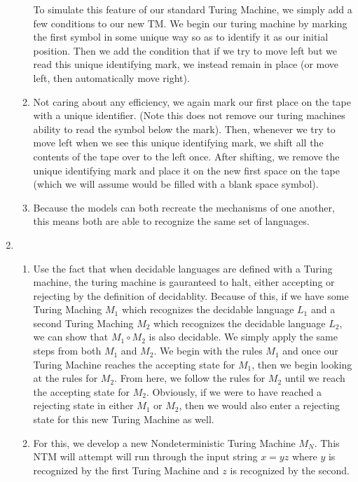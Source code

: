 \documentclass{article}
\begin{document}
\begin{enumerate}
\begin{enumerate}
                To simulate this feature of our standard Turing Machine, we simply add a few conditions to our new TM.
                We begin our turing machine by marking the first symbol in some unique way so as to identify it as our initial position.
                Then we add the condition that if we try to move left but we read this unique identifying mark, we instead remain in place (or move left, then automatically move right).
            \item
                Not caring about any efficiency, we again mark our first place on the tape with a unique identifier. (Note this does not remove our turing machines ability to read the symbol below the mark).
                Then, whenever we try to move left when we see this unique identifying mark, we shift all the contents of the tape over to the left once.
                After shifting, we remove the unique identifying mark and place it on the new first space on the tape (which we will assume would be filled with a blank space symbol).
            \item
                Because the models can both recreate the mechanisms of one another, this means both are able to recognize the same set of languages.
        \end{enumerate}
    \item %
        \begin{enumerate}
            \item
                Use the fact that when decidable languages are defined with a Turing machine, the turing machine is gauranteed to halt, either accepting or rejecting by the definition of decidablity.
                Because of this, if we have some Turing Maching $M_1$ which recognizes the decidable language $L_1$ and a second Turing Maching $M_2$ which recognizes the decidable language $L_2$, we can show that $M_1 \circ M_2$ is also decidable.
                We simply apply the same steps from both $M_1$ and $M_2$.
                We begin with the rules $M_1$ and once our Turing Machine reaches the accepting state for $M_1$, then we begin looking at the rules for $M_2$.
                From here, we follow the rules for $M_2$ until we reach the accepting state for $M_2$.
                Obviously, if we were to have reached a rejecting state in either $M_1$ or $M_2$, then we would also enter a rejecting state for this new Turing Machine as well.
            \item
                For this, we develop a new Nondeterministic Turing Machine $M_N$.
                This NTM will attempt will run through the input string $x = yz$ where $y$ is recognized by the first Turing Machine and $z$ is recognized by the second.

\end{enumerate}
\end{enumerate}
\end{document}
